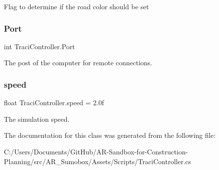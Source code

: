 Flag to determine if the road color should be set 

\mbox{\label{class_traci_controller_a480600f51cbbd8506fbdca8fd3179cb3}} 
\subsubsection{\texorpdfstring{Port}{Port}}
{\footnotesize\ttfamily int Traci\+Controller.\+Port}



The post of the computer for remote connections. 

\mbox{\label{class_traci_controller_abc82770640e1620b43607ad292e97f4e}} 
\subsubsection{\texorpdfstring{speed}{speed}}
{\footnotesize\ttfamily float Traci\+Controller.\+speed = 2.\+0f}



The simulation speed. 



The documentation for this class was generated from the following file\+:\begin{DoxyCompactItemize}
\item 
C\+:/\+Users/\+Documents/\+Git\+Hub/\+A\+R-\/\+Sandbox-\/for-\/\+Construction-\/\+Planning/src/\+A\+R\+\_\+\+Sumobox/\+Assets/\+Scripts/Traci\+Controller.\+cs\end{DoxyCompactItemize}
